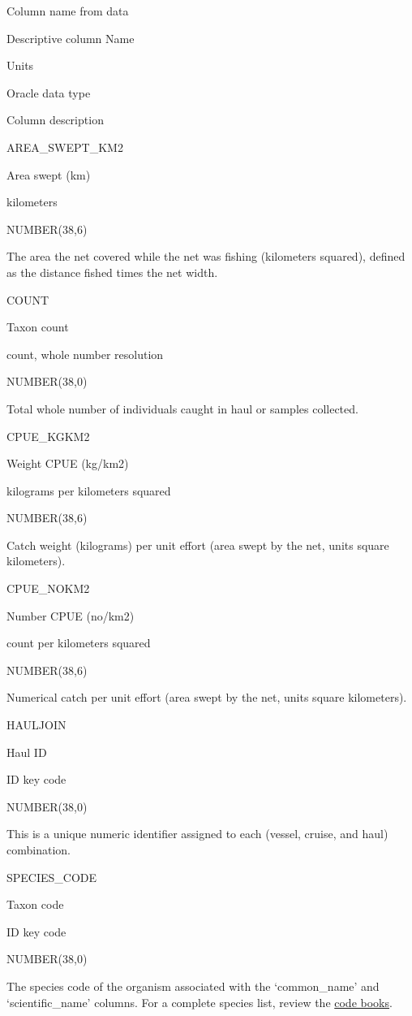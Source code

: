 \documentclass[
  letterpaper,
  oneside,
  open=any]{scrbook}
\begin{document}
Column name from data

Descriptive column Name

Units

Oracle data type

Column description

AREA\_SWEPT\_KM2

Area swept (km)

kilometers

NUMBER(38,6)

The area the net covered while the net was fishing (kilometers squared),
defined as the distance fished times the net width.

COUNT

Taxon count

count, whole number resolution

NUMBER(38,0)

Total whole number of individuals caught in haul or samples collected.

CPUE\_KGKM2

Weight CPUE (kg/km2)

kilograms per kilometers squared

NUMBER(38,6)

Catch weight (kilograms) per unit effort (area swept by the net, units
square kilometers).

CPUE\_NOKM2

Number CPUE (no/km2)

count per kilometers squared

NUMBER(38,6)

Numerical catch per unit effort (area swept by the net, units square
kilometers).

HAULJOIN

Haul ID

ID key code

NUMBER(38,0)

This is a unique numeric identifier assigned to each (vessel, cruise,
and haul) combination.

SPECIES\_CODE

Taxon code

ID key code

NUMBER(38,0)

The species code of the organism associated with the `common\_name' and
`scientific\_name' columns. For a complete species list, review the
\href{https://www.fisheries.noaa.gov/resource/document/groundfish-survey-species-code-manual-and-data-codes-manual}{code
books}.
\end{document}
